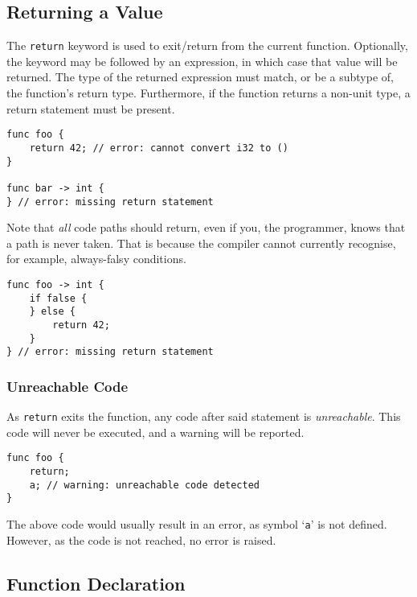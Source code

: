 \documentclass{article}
\begin{document}
    \subsection{Returning a Value}

    The \texttt{return} keyword is used to exit/return from the current function.
    Optionally, the keyword may be followed by an expression, in which case that value will be returned.
    The type of the returned expression must match, or be a subtype of, the function's return type.
    Furthermore, if the function returns a non-unit type, a return statement must be present.

    \begin{lstlisting}[language=CustomLang]
func foo {
    return 42; // error: cannot convert i32 to ()
}

func bar -> int {
} // error: missing return statement
    \end{lstlisting}

    Note that \textit{all} code paths should return, even if you, the programmer, knows that a path is never taken.
    That is because the compiler cannot currently recognise, for example, always-falsy conditions.

    \begin{lstlisting}[language=CustomLang]
func foo -> int {
    if false {
    } else {
        return 42;
    }
} // error: missing return statement
    \end{lstlisting}

    \subsubsection{Unreachable Code}

    As \texttt{return} exits the function, any code after said statement is \textit{unreachable}.
    This code will never be executed, and a warning will be reported.

    \begin{lstlisting}[language=CustomLang]
func foo {
    return;
    a; // warning: unreachable code detected
}
    \end{lstlisting}

    The above code would usually result in an error, as symbol `\texttt{a}' is not defined.
    However, as the code is not reached, no error is raised.

    \subsection{Function Declaration}\label{subsec:function-declaration}
\end{document}
